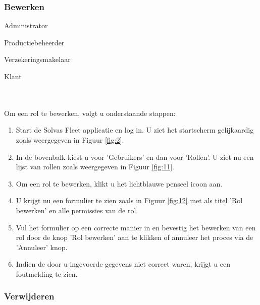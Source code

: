 \documentclass[11pt,openany]{article}
\newcommand{\cmark}{\ding{51}}%
\newcommand{\xmark}{\ding{55}}%
\newcommand{\done}{\rlap{$\square$}{\raisebox{2pt}{\large\hspace{1pt}\cmark}}%
	\hspace{-2.5pt}}
\newcommand{\wontfix}{\rlap{$\square$}{\large\hspace{1pt}\xmark}}
\begin{document}
\newpage
\subsubsection{Bewerken}
\begin{todolist}
	\item[\done] Administrator
	\item[\wontfix] Productiebeheerder
	\item[\wontfix] Verzekeringsmakelaar
	\item[\wontfix] Klant 
\end{todolist}
\\
\\
Om een rol te bewerken, volgt u onderstaande stappen:
\begin{enumerate}
	\item Start de Solvas Fleet applicatie en log in. U ziet het startscherm gelijkaardig zoals weergegeven in Figuur \ref{fig:2}.
	\item In de bovenbalk kiest u voor 'Gebruikers' en dan voor 'Rollen'. U ziet nu een lijst van rollen zoals weergegeven in Figuur \ref{fig:11}.
	\item Om een rol te bewerken, klikt u het lichtblauwe penseel icoon aan. 
	\item U krijgt nu een formulier te zien zoals in Figuur \ref{fig:12} met als titel 'Rol bewerken' en alle permissies van de rol.
	\item Vul het formulier op een correcte manier in en bevestig het bewerken van een rol door de knop 'Rol bewerken' aan te klikken of annuleer het proces via de 'Annuleer' knop.
	\item Indien de door u ingevoerde gegevens niet correct waren, krijgt u een foutmelding te zien.
	
	
\end{enumerate}
\subsubsection{Verwijderen}
\end{document}
